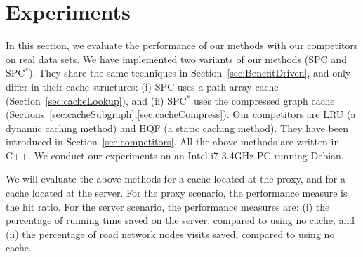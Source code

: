 

\section{Experiments}\label{sec:experiments}
%
In this section, we evaluate the performance of our methods with our competitors on real data sets.
We have implemented two variants of our methods (SPC and SPC$^*$).
They share the same techniques in Section~\ref{sec:BenefitDriven},
and only differ in their cache structures:
(i) SPC uses a path array cache (Section~\ref{sec:cacheLookup}), and (ii) SPC$^*$ uses the compressed graph cache (Sections~\ref{sec:cacheSubgraph},\ref{sec:cacheCompress}).
%
Our competitors are LRU (a dynamic caching method) and HQF (a static caching method).
They have been introduced in Section~\ref{sec:competitors}.
All the above methods are written in C++.
We conduct our experiments on an Intel i7 3.4GHz PC running Debian.

{\color{red}
We will evaluate the above methods for a cache located at the proxy, and for a cache located at the server.
For the proxy scenario, the performance measure is the hit ratio.
For the server scenario, the performance measures are: (i) the percentage of running time saved on the server, compared to using no cache,
and (ii) the percentage of road network nodes visits saved, compared to using no cache.
}











